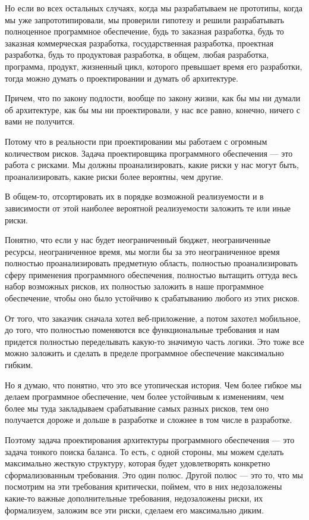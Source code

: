 Но если во всех остальных случаях, когда мы разрабатываем не прототипы, когда мы уже запрототипировали, мы проверили гипотезу и решили разрабатывать полноценное программное обеспечение, будь то заказная разработка, будь то заказная коммерческая разработка, государственная разработка, проектная разработка, будь то продуктовая разработка, в общем, любая разработка, программа, продукт, жизненный цикл, которого превышает время его разработки, тогда можно думать о проектировании и думать об архитектуре.

Причем, что по закону подлости, вообще по закону жизни, как бы мы ни думали об архитектуре, как бы мы ни проектировали, у нас все равно, конечно, ничего с вами не получится.

Потому что в реальности при проектировании мы работаем с огромным количеством рисков. Задача проектировщика программного обеспечения --- это работа с рисками. Мы должны проанализировать, какие риски у нас могут быть, проанализировать, какие риски более вероятны, чем другие.

В общем-то, отсортировать их в порядке возможной реализуемости и в зависимости от этой наиболее вероятной реализуемости заложить те или иные риски.

Понятно, что если у нас будет неограниченный бюджет, неограниченные ресурсы, неограниченное время, мы могли бы за это неограниченное время полностью проанализировать предметную область, полностью проанализировать сферу применения программного обеспечения, полностью вытащить оттуда весь набор возможных рисков, их полностью заложить в наше программное обеспечение, чтобы оно было устойчиво к срабатыванию любого из этих рисков.

От того, что заказчик сначала хотел веб-приложение, а потом захотел мобильное, до того, что полностью поменяются все функциональные требования и нам придется полностью переделывать какую-то значимую часть логики. Это тоже все можно заложить и сделать в пределе программное обеспечение максимально гибким.

Но я думаю, что понятно, что это все утопическая история. Чем более гибкое мы делаем программное обеспечение, чем более устойчивым к изменениям, чем более мы туда закладываем срабатывание самых разных рисков, тем оно получается дороже и дольше в разработке и сложнее в том числе в разработке.

Поэтому задача проектирования архитектуры программного обеспечения --- это задача тонкого поиска баланса. То есть, с одной стороны, мы можем сделать максимально жесткую структуру, которая будет удовлетворять конкретно сформализованным требования. Это один полюс. Другой полюс — это то, что мы посмотрим на эти требования критически, поймем, что в них недозаложены какие-то важные дополнительные требования, недозаложены риски, их формализуем, заложим все эти риски, сделаем его максимально диким. 

